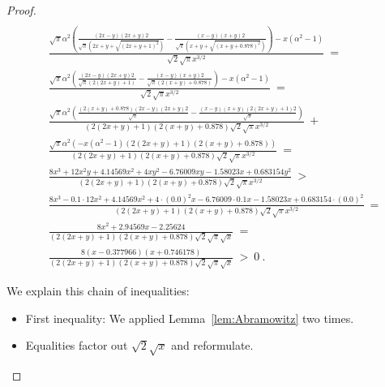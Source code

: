 \documentclass{article}
\begin{document}
\begin{proof}
\begin{align}
  \\ \nonumber 
&\frac{\sqrt{\pi } \alpha ^2 \left(\frac{(2 x-y) (2 x+y) 2}{\sqrt{\pi } \left(2 x+y+\sqrt{(2 x+y+1)^2}\right)}-\frac{(x-y) (x+y) 2}{\sqrt{\pi } \left(x+y+\sqrt{(x+y+0.878)^2}\right)}\right)-x \left(\alpha ^2-1\right)}{\sqrt{2} \sqrt{\pi } x^{3/2}}\ =
  \\ \nonumber 
&\frac{\sqrt{\pi } \alpha ^2 \left(\frac{(2 x-y) (2 x+y) 2}{\sqrt{\pi } (2 (2 x+y)+1)}-\frac{(x-y) (x+y) 2}{\sqrt{\pi } (2 (x+y)+0.878)}\right)-x \left(\alpha ^2-1\right)}{\sqrt{2} \sqrt{\pi } x^{3/2}}\ =
  \\ \nonumber 
&\frac{\sqrt{\pi } \alpha ^2 \left(\frac{(2
                 (x+y)+0.878) (2 x-y) (2 x+y) 2}{\sqrt{\pi
                 }}-\frac{(x-y) (x+y) (2 (2 x+y)+1) 2}{\sqrt{\pi
                 }}\right)}{(2 (2 x+y)+1) (2 (x+y)+0.878) \sqrt{2}
                 \sqrt{\pi } x^{3/2}} \ + \\\nonumber &\frac{\sqrt{\pi } \alpha ^2 \left(-x \left(\alpha ^2-1\right) (2 (2 x+y)+1) (2 (x+y)+0.878)\right)}{(2 (2 x+y)+1) (2 (x+y)+0.878) \sqrt{2} \sqrt{\pi } x^{3/2}}\ =
  \\ \nonumber &\frac{8 x^3+12 x^2 y+4.14569 x^2+4 x y^2-6.76009 x y-1.58023 x+0.683154 y^2}{(2 (2 x+y)+1) (2 (x+y)+0.878) \sqrt{2} \sqrt{\pi } x^{3/2}}\ >
  \\ \nonumber 
& \frac{8 x^3-0.1 \cdot 12 x^2+4.14569 x^2+4 \cdot (0.0)^2 x-6.76009 \cdot 0.1 x-1.58023 x+0.683154 \cdot (0.0)^2}{(2 (2 x+y)+1) (2 (x+y)+0.878) \sqrt{2} \sqrt{\pi } x^{3/2}}\ =
  \\ \nonumber &\frac{8 x^2+2.94569 x-2.25624}{(2 (2 x+y)+1) (2 (x+y)+0.878) \sqrt{2} \sqrt{\pi } \sqrt{x}}\ =
  \\ \nonumber &\frac{8 (x-0.377966) (x+0.746178)}{(2 (2 x+y)+1) (2
(x+y)+0.878) \sqrt{2} \sqrt{\pi } \sqrt{x}} \ > \ 0 \ .
\end{align}



We explain this chain of inequalities:
\begin{itemize}
\item First inequality: We applied Lemma~\ref{lem:Abramowitz} two times.

\item Equalities factor out $\sqrt{2} \sqrt{x}$ and reformulate.


\end{itemize}
\end{proof}
\end{document}
